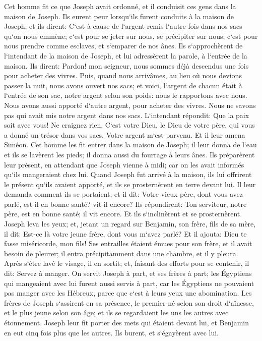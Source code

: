 \verse Cet homme fit ce que Joseph avait ordonné, et il conduisit ces gens dans la maison de Joseph. 
\verse Ils eurent peur lorsqu`ils furent conduits à la maison de Joseph, et ils dirent: C`est à cause de l`argent remis l`autre fois dans nos sacs qu`on nous emmène; c`est pour se jeter sur nous, se précipiter sur nous; c`est pour nous prendre comme esclaves, et s`emparer de nos ânes. 
\verse Ils s`approchèrent de l`intendant de la maison de Joseph, et lui adressèrent la parole, à l`entrée de la maison. 
\verse Ils dirent: Pardon! mon seigneur, nous sommes déjà descendus une fois pour acheter des vivres. 
\verse Puis, quand nous arrivâmes, au lieu où nous devions passer la nuit, nous avons ouvert nos sacs; et voici, l`argent de chacun était à l`entrée de son sac, notre argent selon son poids: nous le rapportons avec nous. 
\verse Nous avons aussi apporté d`autre argent, pour acheter des vivres. Nous ne savons pas qui avait mis notre argent dans nos sacs. 
\verse L`intendant répondit: Que la paix soit avec vous! Ne craignez rien. C`est votre Dieu, le Dieu de votre père, qui vous a donné un trésor dans vos sacs. Votre argent m`est parvenu. Et il leur amena Siméon. 
\verse Cet homme les fit entrer dans la maison de Joseph; il leur donna de l`eau et ils se lavèrent les pieds; il donna aussi du fourrage à leurs ânes. 
\verse Ils préparèrent leur présent, en attendant que Joseph vienne à midi; car on les avait informés qu`ils mangeraient chez lui. 
\verse Quand Joseph fut arrivé à la maison, ils lui offrirent le présent qu`ils avaient apporté, et ils se prosternèrent en terre devant lui. 
\verse Il leur demanda comment ils se portaient; et il dit: Votre vieux père, dont vous avez parlé, est-il en bonne santé? vit-il encore? 
\verse Ils répondirent: Ton serviteur, notre père, est en bonne santé; il vit encore. Et ils s`inclinèrent et se prosternèrent. 
\verse Joseph leva les yeux; et, jetant un regard sur Benjamin, son frère, fils de sa mère, il dit: Est-ce là votre jeune frère, dont vous m`avez parlé? Et il ajouta: Dieu te fasse miséricorde, mon fils! 
\verse Ses entrailles étaient émues pour son frère, et il avait besoin de pleurer; il entra précipitamment dans une chambre, et il y pleura. 
\verse Après s`être lavé le visage, il en sortit; et, faisant des efforts pour se contenir, il dit: Servez à manger. 
\verse On servit Joseph à part, et ses frères à part; les Égyptiens qui mangeaient avec lui furent aussi servis à part, car les Égyptiens ne pouvaient pas manger avec les Hébreux, parce que c`est à leurs yeux une abomination. 
\verse Les frères de Joseph s`assirent en sa présence, le premier-né selon son droit d`aînesse, et le plus jeune selon son âge; et ils se regardaient les uns les autres avec étonnement. 
\verse Joseph leur fit porter des mets qui étaient devant lui, et Benjamin en eut cinq fois plus que les autres. Ils burent, et s`égayèrent avec lui. 

